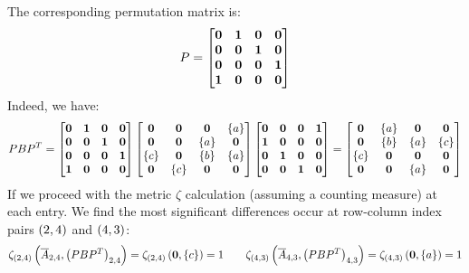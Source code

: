 \begin{example}
  The corresponding permutation matrix is:
  \begin{align*}
    P =
      \begin{bmatrix}
        \mathbf{0} & \mathbf{1} & \mathbf{0} & \mathbf{0} \\
        \mathbf{0} & \mathbf{0} & \mathbf{1} & \mathbf{0} \\
        \mathbf{0} & \mathbf{0} & \mathbf{0} & \mathbf{1} \\
        \mathbf{1} & \mathbf{0} & \mathbf{0} & \mathbf{0}
      \end{bmatrix}
  \end{align*}
  Indeed, we have:
  \begin{align*}
    PB{P}^T
    =
      \begin{bmatrix}
        \mathbf{0} & \mathbf{1} & \mathbf{0} & \mathbf{0} \\
        \mathbf{0} & \mathbf{0} & \mathbf{1} & \mathbf{0} \\
        \mathbf{0} & \mathbf{0} & \mathbf{0} & \mathbf{1} \\
        \mathbf{1} & \mathbf{0} & \mathbf{0} & \mathbf{0}
      \end{bmatrix}
      \begin{bmatrix}
        \mathbf{0} & \mathbf{0} & \mathbf{0} & \left\{a\right\} \\
        \mathbf{0} & \mathbf{0} & \left\{a\right\} & \mathbf{0} \\
        \left\{c\right\} & \mathbf{0} & \left\{b\right\} & \left\{a\right\} \\
        \mathbf{0} & \left\{c\right\} & \mathbf{0} & \mathbf{0}
      \end{bmatrix}
      \begin{bmatrix}
        \mathbf{0} & \mathbf{0} & \mathbf{0} & \mathbf{1} \\
        \mathbf{1} & \mathbf{0} & \mathbf{0} & \mathbf{0} \\
        \mathbf{0} & \mathbf{1} & \mathbf{0} & \mathbf{0} \\
        \mathbf{0} & \mathbf{0} & \mathbf{1} & \mathbf{0}
      \end{bmatrix}
    =
      \begin{bmatrix}
        \mathbf{0} & \left\{a\right\} & \mathbf{0} & \mathbf{0} \\
        \mathbf{0} & \left\{b\right\} & \left\{a\right\} & \left\{c\right\} \\
        \left\{c\right\} & \mathbf{0} & \mathbf{0} & \mathbf{0} \\
        \mathbf{0} & \mathbf{0} & \left\{a\right\} & \mathbf{0}
      \end{bmatrix}
  \end{align*}
  If we proceed with the metric \(\zeta\) calculation
  (assuming a counting measure) at each entry.
  We find the most significant differences occur
  at row-column index pairs \(\left(2, 4\right)\) and \(\left(4, 3\right)\):
  \begin{align*}
    \zeta_{\left(2, 4\right)}\left(\overline{A}_{2, 4},
           \left(PB{P^T}\right)_{2, 4}\right)
      = \zeta_{\left(2, 4\right)}\left(\mathbf{0}, \left\{c\right\}\right) = 1
    \qquad
    \zeta_{\left(4, 3\right)} \left(\overline{A}_{4, 3},
           \left(PB{P^T}\right)_{4, 3}\right)
      = \zeta_{\left(4, 3\right)}\left(\mathbf{0}, \left\{a\right\}\right) = 1
  \end{align*}

\end{example}




